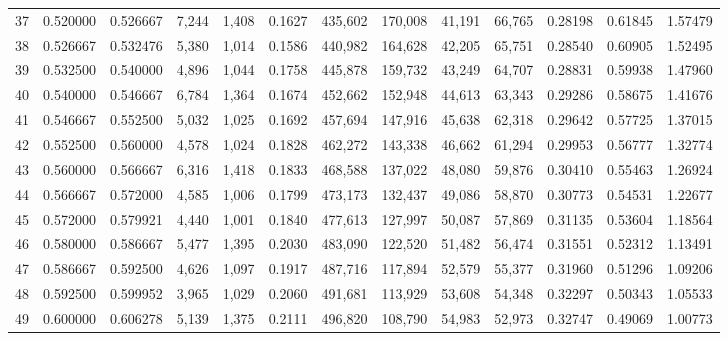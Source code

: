 \begin{tabular}{rrrrrrrrrrrrr}
37 &  0.520000 &  0.526667 &   7,244 &  1,408 &                                     0.1627 &  435,602 &  170,008 &   41,191 &   66,765 &  0.28198 &  0.61845 &  1.57479 \\
38 &  0.526667 &  0.532476 &   5,380 &  1,014 &                                     0.1586 &  440,982 &  164,628 &   42,205 &   65,751 &  0.28540 &  0.60905 &  1.52495 \\
39 &  0.532500 &  0.540000 &   4,896 &  1,044 &                                     0.1758 &  445,878 &  159,732 &   43,249 &   64,707 &  0.28831 &  0.59938 &  1.47960 \\
40 &  0.540000 &  0.546667 &   6,784 &  1,364 &                                     0.1674 &  452,662 &  152,948 &   44,613 &   63,343 &  0.29286 &  0.58675 &  1.41676 \\
41 &  0.546667 &  0.552500 &   5,032 &  1,025 &                                     0.1692 &  457,694 &  147,916 &   45,638 &   62,318 &  0.29642 &  0.57725 &  1.37015 \\
42 &  0.552500 &  0.560000 &   4,578 &  1,024 &                                     0.1828 &  462,272 &  143,338 &   46,662 &   61,294 &  0.29953 &  0.56777 &  1.32774 \\
43 &  0.560000 &  0.566667 &   6,316 &  1,418 &                                     0.1833 &  468,588 &  137,022 &   48,080 &   59,876 &  0.30410 &  0.55463 &  1.26924 \\
44 &  0.566667 &  0.572000 &   4,585 &  1,006 &                                     0.1799 &  473,173 &  132,437 &   49,086 &   58,870 &  0.30773 &  0.54531 &  1.22677 \\
45 &  0.572000 &  0.579921 &   4,440 &  1,001 &                                     0.1840 &  477,613 &  127,997 &   50,087 &   57,869 &  0.31135 &  0.53604 &  1.18564 \\
46 &  0.580000 &  0.586667 &   5,477 &  1,395 &                                     0.2030 &  483,090 &  122,520 &   51,482 &   56,474 &  0.31551 &  0.52312 &  1.13491 \\
47 &  0.586667 &  0.592500 &   4,626 &  1,097 &                                     0.1917 &  487,716 &  117,894 &   52,579 &   55,377 &  0.31960 &  0.51296 &  1.09206 \\
48 &  0.592500 &  0.599952 &   3,965 &  1,029 &                                     0.2060 &  491,681 &  113,929 &   53,608 &   54,348 &  0.32297 &  0.50343 &  1.05533 \\
49 &  0.600000 &  0.606278 &   5,139 &  1,375 &                                     0.2111 &  496,820 &  108,790 &   54,983 &   52,973 &  0.32747 &  0.49069 &  1.00773 \\

\end{tabular}
